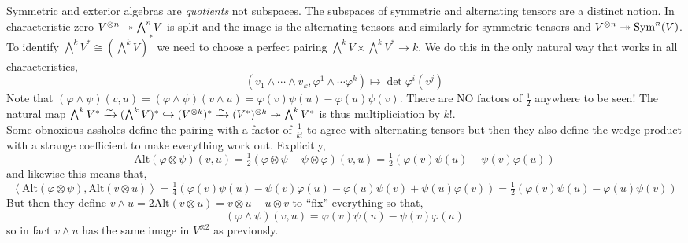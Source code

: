 \documentclass[12pt]{article}
\begin{document}
Symmetric and exterior algebras are \textit{quotients} not subspaces. The subspaces of symmetric and alternating tensors are a distinct notion. In characteristic zero $V^{\otimes n} \twoheadrightarrow \bigwedge^n V$ is split and the image is the alternating tensors and similarly for symmetric tensors and $V^{\otimes n} \twoheadrightarrow \mathrm{Sym}^n(V)$.
\bigskip\\
To identify $\bigwedge^k V^* \cong (\bigwedge^k V)^*$ we need to choose a perfect pairing $\bigwedge^k V \times \bigwedge^k V^* \to k$. We do this in the only natural way that works in all characteristics,
\[ (v_1 \wedge \cdots \wedge v_k, \varphi^1 \wedge \cdots \varphi^k) \mapsto \det{\varphi^i(v^j)} \]
Note that $(\varphi \wedge \psi)(v, u) = (\varphi \wedge \psi)(v \wedge u) = \varphi(v) \psi(u) - \varphi(u) \psi(v)$. There are NO factors of $\frac{1}{2}$ anywhere to be seen! The natural map $\bigwedge^k V^* \xrightarrow{\sim} (\bigwedge^k V)^* \hookrightarrow (V^{\otimes k})^* \xrightarrow{\sim} (V^*)^{\otimes k} \twoheadrightarrow \bigwedge^k V^*$ is thus multipliciation by $k!$. 
\bigskip\\
Some obnoxious assholes define the pairing with a factor of $\frac{1}{k!}$ to agree with alternating tensors but then they also define the wedge product with a strange coefficient to make everything work out. Explicitly,
\[ \mathrm{Alt}(\varphi \otimes \psi)(v, u) = \tfrac{1}{2} \left( \varphi \otimes \psi - \psi \otimes \varphi \right)(v, u) = \tfrac{1}{2} \left( \varphi(v) \psi(u) - \psi(v) \varphi(u) \right) \]
and likewise this means that,
\[ \left< \mathrm{Alt}(\varphi \otimes \psi), \mathrm{Alt}(v \otimes u) \right> = \tfrac{1}{4} \left( \varphi(v) \psi(u) - \psi(v) \varphi(u) - \varphi(u) \psi(v) + \psi(u) \varphi(v) \right) = \tfrac{1}{2} \left( \varphi(v) \psi(u) - \varphi(u) \psi(v) \right) \]
But then they define $v \wedge u = 2 \mathrm{Alt}(v \otimes u) = v \otimes u - u \otimes v$ to ``fix'' everything so that,
\[ (\varphi \wedge \psi)(v, u) = \varphi(v) \psi(u) - \psi(v) \varphi(u) \]
so in fact $v \wedge u$ has the same image in $V^{\otimes 2}$ as previously.
\end{document}
